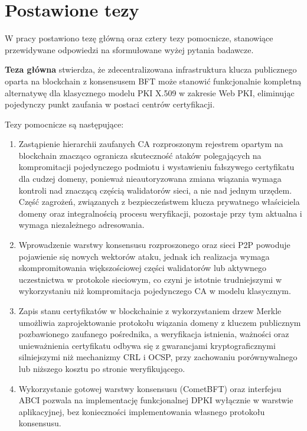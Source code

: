 \section{Postawione tezy}
\label{sec:tezy}

W pracy postawiono tezę główną oraz cztery tezy pomocnicze, stanowiące przewidywane odpowiedzi na sformułowane wyżej pytania badawcze.

\textbf{Teza główna} stwierdza, że zdecentralizowana infrastruktura klucza publicznego oparta na blockchain z konsensusem BFT może stanowić funkcjonalnie kompletną alternatywę dla klasycznego modelu PKI X.509 w zakresie Web PKI, eliminując pojedynczy punkt zaufania w postaci centrów certyfikacji.

Tezy pomocnicze są następujące:
\begin{enumerate}
    \item Zastąpienie hierarchii zaufanych CA rozproszonym rejestrem opartym na blockchain znacząco ogranicza skuteczność ataków polegających na kompromitacji pojedynczego podmiotu i wystawieniu fałszywego certyfikatu dla cudzej domeny, ponieważ nieautoryzowana zmiana wiązania wymaga kontroli nad znaczącą częścią walidatorów sieci, a nie nad jednym urzędem. Część zagrożeń, związanych z bezpieczeństwem klucza prywatnego właściciela domeny oraz integralnością procesu weryfikacji, pozostaje przy tym aktualna i wymaga niezależnego adresowania.
    \item Wprowadzenie warstwy konsensusu rozproszonego oraz sieci P2P powoduje pojawienie się nowych wektorów ataku, jednak ich realizacja wymaga skompromitowania większościowej części walidatorów lub aktywnego uczestnictwa w protokole sieciowym, co czyni je istotnie trudniejszymi w wykorzystaniu niż kompromitacja pojedynczego CA w modelu klasycznym.
    \item Zapis stanu certyfikatów w blockchainie z wykorzystaniem drzew Merkle umożliwia zaprojektowanie protokołu wiązania domeny z kluczem publicznym pozbawionego zaufanego pośrednika, a weryfikacja istnienia, ważności oraz unieważnienia certyfikatu odbywa się z gwarancjami kryptograficznymi silniejszymi niż mechanizmy CRL i OCSP, przy zachowaniu porównywalnego lub niższego kosztu po stronie weryfikującego.
    \item Wykorzystanie gotowej warstwy konsensusu (CometBFT) oraz interfejsu ABCI pozwala na implementację funkcjonalnej DPKI wyłącznie w warstwie aplikacyjnej, bez konieczności implementowania własnego protokołu konsensusu.
\end{enumerate}


